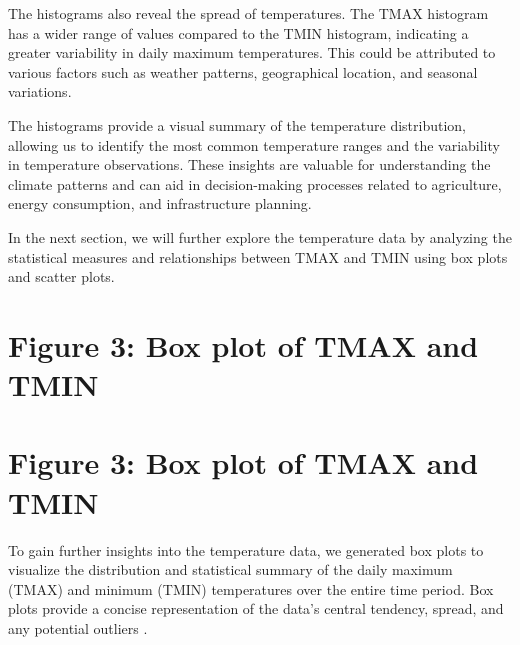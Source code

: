 \documentclass{article}
\begin{document}
The histograms also reveal the spread of temperatures. The TMAX histogram has a wider range of values compared to the TMIN histogram, indicating a greater variability in daily maximum temperatures. This could be attributed to various factors such as weather patterns, geographical location, and seasonal variations.

The histograms provide a visual summary of the temperature distribution, allowing us to identify the most common temperature ranges and the variability in temperature observations. These insights are valuable for understanding the climate patterns and can aid in decision-making processes related to agriculture, energy consumption, and infrastructure planning.

In the next section, we will further explore the temperature data by analyzing the statistical measures and relationships between TMAX and TMIN using box plots and scatter plots.

\section{Figure 3: Box plot of TMAX and TMIN}

\section{Figure 3: Box plot of TMAX and TMIN}

To gain further insights into the temperature data, we generated box plots to visualize the distribution and statistical summary of the daily maximum (TMAX) and minimum (TMIN) temperatures over the entire time period. Box plots provide a concise representation of the data's central tendency, spread, and any potential outliers \cite{tukey1977exploratory}.
\end{document}
